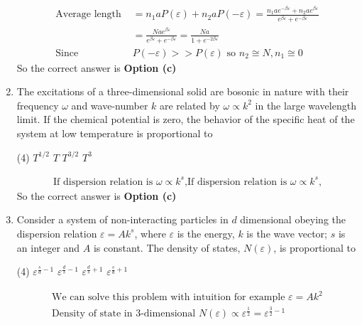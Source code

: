 \begin{enumerate}
\begin{answer}
\begin{align*}
	\text{Average length }&=n_{1} a P(\varepsilon)+n_{2} a P(-\varepsilon)=\frac{n_{1} a e^{-\beta \varepsilon}+n_{2} a e^{\beta \varepsilon}}{e^{\beta \varepsilon}+e^{-\beta \varepsilon}}\\&=\frac{N a e^{\beta \varepsilon}}{e^{\beta \varepsilon}+e^{-\beta \varepsilon}}=\frac{N a}{1+e^{-2 \beta \varepsilon}}\\
	\text{Since }&P(-\varepsilon)>>P(\varepsilon)\text{ so }n_{2} \cong N, n_{1} \cong 0
	\end{align*}
	So the correct answer is \textbf{Option (c)}
\end{answer}
	\item The excitations of a three-dimensional solid are bosonic in nature with their frequency $\omega$ and wave-number $k$ are related by $\omega \propto k^{2}$ in the large wavelength limit. If the chemical potential is zero, the behavior of the specific heat of the system at low temperature is proportional to
	{}
	\begin{tasks}(4)
		\task[\textbf{a.}] $T^{1 / 2}$
		\task[\textbf{b.}] $T$
		\task[\textbf{c.}]  $T^{3 / 2}$
		\task[\textbf{d.}] $T^{3}$
	\end{tasks}
\begin{answer}
	\begin{align*}
	\text{If dispersion relation is $\omega \propto k^{s}$,}
	\text{If dispersion relation is $\omega \propto k^{s}$,}
	\end{align*}
	So the correct answer is \textbf{Option (c)}
\end{answer}
	\item Consider a system of non-interacting particles in $d$ dimensional obeying the dispersion relation $\varepsilon=A k^{s}$, where $\varepsilon$ is the energy, $k$ is the wave vector; $s$ is an integer and $A$ is constant. The density of states, $N(\varepsilon)$, is proportional to
	{}
	\begin{tasks}(4)
		\task[\textbf{a.}] $\varepsilon^{\frac{s}{d}-1}$
		\task[\textbf{b.}] $\varepsilon^{\frac{d}{s}-1}$
		\task[\textbf{c.}] $\varepsilon^{\frac{d}{s}+1}$
		\task[\textbf{d.}] $\varepsilon^{\frac{s}{d}+1}$
	\end{tasks}
\begin{answer}
	\begin{align*}
	\text{We can solve this problem with intuition for example $\varepsilon=A k^{2}$}\\
	\text{Density of state in 3-dimensional $N(\varepsilon) \propto \varepsilon^{\frac{1}{2}}=\varepsilon^{\frac{3}{2}-1}$}\\

\end{align*}
\end{answer}
\end{enumerate}
